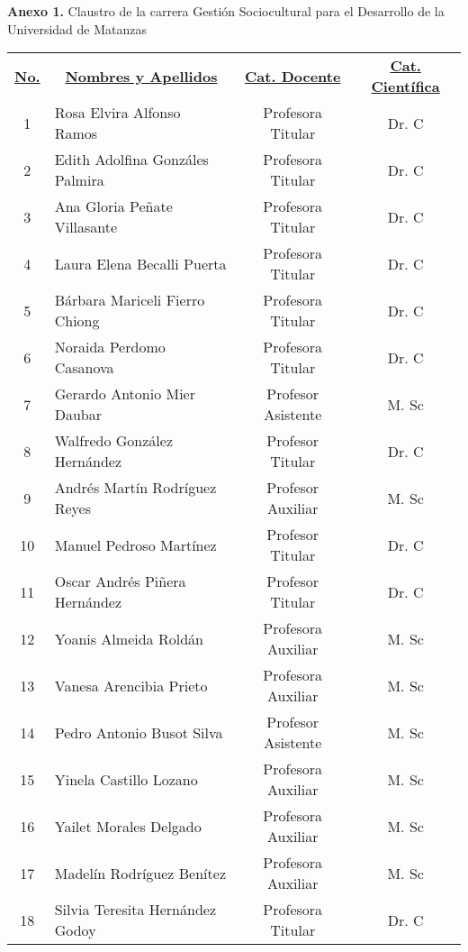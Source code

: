 \textbf{Anexo 1.} Claustro de la carrera Gestión Sociocultural para el Desarrollo de la Universidad de Matanzas

\begin{longtable}{|c|p{7cm}|c|c|}
		\endfirsthead
	
	\mc{4}{>{}c}{\tablename\ del anexo 1 Continuación de la página anterior }\\ 
	
	\endhead
	\hline
	\underline{\textbf{No.}}& \multicolumn{1}{c|}{\underline{\textbf{Nombres y Apellidos}}}  & \underline{\textbf{Cat. Docente}} &  \underline{\textbf{Cat. Científica}} \\
	\hline
	1 & Rosa Elvira Alfonso Ramos & Profesora Titular & Dr. C
\\ \hline
	2 & Edith Adolfina Gonzáles Palmira & Profesora Titular & Dr. C
\\ \hline
	3 & Ana Gloria Peñate Villasante & Profesora Titular & Dr. C
\\ \hline
	4 & Laura Elena Becalli Puerta & Profesora Titular & Dr. C \\ \hline
	5 & Bárbara Mariceli Fierro Chiong & Profesora Titular & Dr. C
 \\ \hline
	6 & Noraida Perdomo Casanova & Profesora Titular & Dr. C
\\ \hline
	7 & Gerardo Antonio Mier Daubar & Profesor Asistente & M. Sc
 \\ \hline
	8 & Walfredo González Hernández & Profesor Titular & Dr. C
\\ \hline
	9 & Andrés Martín Rodríguez Reyes & Profesor Auxiliar & M. Sc
\\ \hline
	10 & Manuel Pedroso Martínez & Profesor Titular & Dr. C
\\ \hline
	11 & Oscar Andrés Piñera Hernández & Profesor Titular & Dr. C
\\ \hline
	12 & Yoanis Almeida Roldán & Profesora Auxiliar & M. Sc
\\ \hline
	13 & Vanesa Arencibia Prieto & Profesora Auxiliar & M. Sc
\\ \hline
	14 & Pedro Antonio Busot Silva & Profesor Asistente & M. Sc
\\ \hline
	15 & Yinela Castillo Lozano & Profesora Auxiliar & M. Sc
\\ \hline
	16 & Yailet Morales Delgado & Profesora Auxiliar & M. Sc
\\ \hline
	17 & Madelín Rodríguez Benítez & Profesora Auxiliar & M. Sc
\\ \hline
	18 & Silvia Teresita Hernández Godoy & Profesora Titular & Dr. C

\end{longtable}

